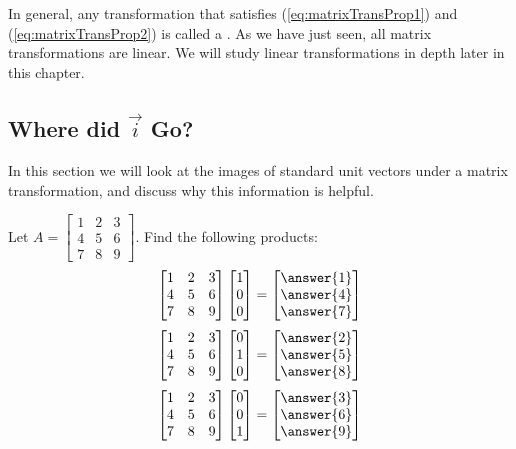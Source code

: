 \documentclass{ximera}
\begin{document}
In general, any transformation that satisfies (\ref{eq:matrixTransProp1}) and (\ref{eq:matrixTransProp2}) is called a .  As we have just seen, all matrix transformations are linear.
We will study linear transformations in depth later in this chapter.

\subsection*{Where did $\vec{i}$ Go?}
In this section we will look at the images of standard unit vectors under a matrix transformation, and discuss why this information is helpful.
\begin{exploration}\label{exp:imagesOfijk}
    Let $A=\begin{bmatrix}1&2&3\\4&5&6\\7&8&9\end{bmatrix}$.
    Find the following products:
$$\begin{bmatrix}1&2&3\\4&5&6\\7&8&9\end{bmatrix}\begin{bmatrix}1\\0\\0\end{bmatrix}=\begin{bmatrix}\answer{1}\\\answer{4}\\\answer{7}\end{bmatrix}$$
$$\begin{bmatrix}1&2&3\\4&5&6\\7&8&9\end{bmatrix}\begin{bmatrix}0\\1\\0\end{bmatrix}=\begin{bmatrix}\answer{2}\\\answer{5}\\\answer{8}\end{bmatrix}$$
$$\begin{bmatrix}1&2&3\\4&5&6\\7&8&9\end{bmatrix}\begin{bmatrix}0\\0\\1\end{bmatrix}=\begin{bmatrix}\answer{3}\\\answer{6}\\\answer{9}\end{bmatrix}$$


\end{exploration}
\end{document}
